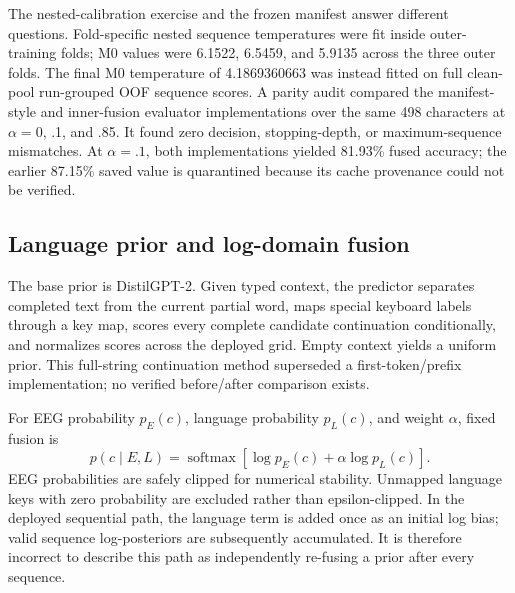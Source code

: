 \documentclass[final,5p,times,twocolumn,authoryear]{elsarticle}
\begin{document}
The nested-calibration exercise and the frozen manifest answer different questions. Fold-specific nested sequence temperatures were fit inside outer-training folds; M0 values were 6.1522, 6.5459, and 5.9135 across the three outer folds. The final M0 temperature of 4.1869360663 was instead fitted on full clean-pool run-grouped OOF sequence scores. A parity audit compared the manifest-style and inner-fusion evaluator implementations over the same 498 characters at $\alpha=0$, .1, and .85. It found zero decision, stopping-depth, or maximum-sequence mismatches. At $\alpha=.1$, both implementations yielded 81.93\% fused accuracy; the earlier 87.15\% saved value is quarantined because its cache provenance could not be verified.

\begin{table}[t]
\centering\small
\caption{Study D classifier selection evidence. OOF and manifest values are separate populations.}\label{tab:classifier}
\end{table}

\subsection{Language prior and log-domain fusion}
The base prior is DistilGPT-2. Given typed context, the predictor separates completed text from the current partial word, maps special keyboard labels through a key map, scores every complete candidate continuation conditionally, and normalizes scores across the deployed grid. Empty context yields a uniform prior. This full-string continuation method superseded a first-token/prefix implementation; no verified before/after comparison exists.

For EEG probability $p_E(c)$, language probability $p_L(c)$, and weight $\alpha$, fixed fusion is
\begin{equation}
p(c\mid E,L)=\operatorname{softmax}\left[\log p_E(c)+\alpha\log p_L(c)\right].
\label{eq:fusion}
\end{equation}
EEG probabilities are safely clipped for numerical stability. Unmapped language keys with zero probability are excluded rather than epsilon-clipped. In the deployed sequential path, the language term is added once as an initial log bias; valid sequence log-posteriors are subsequently accumulated. It is therefore incorrect to describe this path as independently re-fusing a prior after every sequence.
\end{document}
